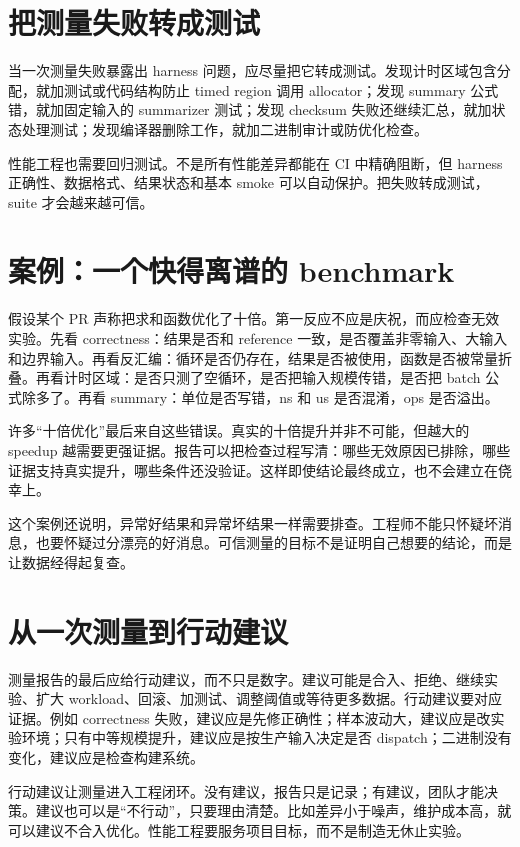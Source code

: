 \section{把测量失败转成测试}

当一次测量失败暴露出 harness 问题，应尽量把它转成测试。发现计时区域包含分配，就加测试或代码结构防止 timed region 调用 allocator；发现 summary 公式错，就加固定输入的 summarizer 测试；发现 checksum 失败还继续汇总，就加状态处理测试；发现编译器删除工作，就加二进制审计或防优化检查。

性能工程也需要回归测试。不是所有性能差异都能在 CI 中精确阻断，但 harness 正确性、数据格式、结果状态和基本 smoke 可以自动保护。把失败转成测试，suite 才会越来越可信。

\section{案例：一个快得离谱的 benchmark}

假设某个 PR 声称把求和函数优化了十倍。第一反应不应是庆祝，而应检查无效实验。先看 correctness：结果是否和 reference 一致，是否覆盖非零输入、大输入和边界输入。再看反汇编：循环是否仍存在，结果是否被使用，函数是否被常量折叠。再看计时区域：是否只测了空循环，是否把输入规模传错，是否把 batch 公式除多了。再看 summary：单位是否写错，ns 和 us 是否混淆，ops 是否溢出。

许多“十倍优化”最后来自这些错误。真实的十倍提升并非不可能，但越大的 speedup 越需要更强证据。报告可以把检查过程写清：哪些无效原因已排除，哪些证据支持真实提升，哪些条件还没验证。这样即使结论最终成立，也不会建立在侥幸上。

这个案例还说明，异常好结果和异常坏结果一样需要排查。工程师不能只怀疑坏消息，也要怀疑过分漂亮的好消息。可信测量的目标不是证明自己想要的结论，而是让数据经得起复查。

\section{从一次测量到行动建议}

测量报告的最后应给行动建议，而不只是数字。建议可能是合入、拒绝、继续实验、扩大 workload、回滚、加测试、调整阈值或等待更多数据。行动建议要对应证据。例如 correctness 失败，建议应是先修正确性；样本波动大，建议应是改实验环境；只有中等规模提升，建议应是按生产输入决定是否 dispatch；二进制没有变化，建议应是检查构建系统。

行动建议让测量进入工程闭环。没有建议，报告只是记录；有建议，团队才能决策。建议也可以是“不行动”，只要理由清楚。比如差异小于噪声，维护成本高，就可以建议不合入优化。性能工程要服务项目目标，而不是制造无休止实验。

